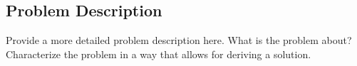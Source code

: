 \subsection{Problem Description}
Provide a more detailed problem description here. What is the problem about? Characterize the problem in a way that allows for deriving a solution.
